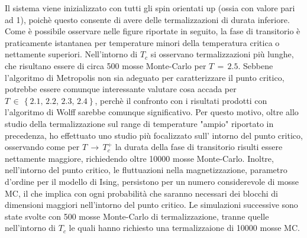 Il sistema viene inizializzato con tutti gli spin orientati up (ossia con valore pari ad 1), poichè questo consente di avere delle 
termalizzazioni di durata inferiore. Come è possibile osservare nelle figure riportate in seguito, la fase di transitorio è praticamente 
istantanea per temperature minori della temperatura critica o nettamente superiori. Nell'intorno di $T_c$ si osservano termalizzazioni 
più lunghe, che risultano essere di circa 500 mosse Monte-Carlo per $T\,=\,2.5$. Sebbene l'algoritmo di Metropolis non sia adeguato 
per caratterizzare il punto critico, potrebbe essere comunque interessante valutare cosa accada per $T\,\in\,\left\{2.1,\,2.2,\,2.3,\,2.4\right\}$, 
perchè il confronto con i risultati prodotti con l'algoritmo di Wolff sarebbe comunque significativo. Per questo motivo, oltre allo 
studio della termalizzazione sul range di temperature "ampio" riportato in precedenza, ho effettuato uno studio più focalizzato sull'
intorno del punto critico, osservando come per $T\,\to\,T_c^+$ la durata della fase di transitorio risulti essere nettamente maggiore, 
richiedendo oltre 10000 mosse Monte-Carlo. Inoltre, nell'intorno del punto critico, le fluttuazioni nella magnetizzazione, parametro 
d'ordine per il modello di Ising, persistono per un numero considerevole di mosse MC, il che implica con ogni probabilità che saranno 
necessari dei blocchi di dimensioni maggiori nell'intorno del punto critico. Le simulazioni successive sono state svolte con 500 mosse 
Monte-Carlo di termalizzazione, tranne quelle nell'intorno di $T_c$ le quali hanno richiesto una termalizzaione di 10000 mosse MC.


\vspace*{\fill}

